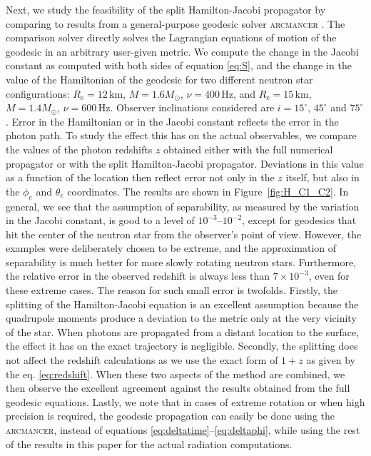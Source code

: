 \documentclass{aa}
\newcommand{\Msun}{\ensuremath{M_{\odot}}}
\begin{document}
Next, we study the feasibility of the split Hamilton-Jacobi propagator by comparing to results from a general-purpose geodesic solver \textsc{arcmancer} \citep{PRJ16}.
The comparison solver directly solves the Lagrangian equations of motion of the geodesic in an arbitrary user-given metric. 
We compute the change in the Jacobi constant as computed with both sides of equation \eqref{eq:S}, and the change in the value of the Hamiltonian of the geodesic for two different neutron star configurations:
$R_{\mathrm{e}}=12\,\mathrm{km}$, $M=1.6\Msun$, $\nu=400\,\mathrm{Hz}$, and $R_{\mathrm{e}}=15\,\mathrm{km}$, $M=1.4\Msun$, $\nu=600\,\mathrm{Hz}$.
Observer inclinations considered are $i=15^\circ$, $45^\circ$ and $75^\circ$.
Error in the Hamiltonian or in the Jacobi constant reflects the error in the photon path.
To study the effect this has on the actual observables, we compare the values of the photon redshifts $z$ obtained either with the full numerical propagator or with the split Hamilton-Jacobi propagator.
Deviations in this value as a function of the location then reflect error not only in the $z$ itself, but also in the $\phi_e$ and $\theta_e$ coordinates.
The results are shown in Figure~\ref{fig:H_C1_C2}. 
In general, we see that the assumption of separability, as measured by the variation in the Jacobi constant, is good to a level of $10^{-3}$--$10^{-2}$, except for geodesics that hit the center of the neutron star from the observer's point of view. 
However, the examples were deliberately chosen to be extreme, and the approximation of separability is much better for more slowly rotating neutron stars.
Furthermore, the relative error in the observed redshift is always less than $7 \times 10^{-3}$, even for these extreme cases.
The reason for such small error is twofolds.
Firstly, the splitting of the Hamilton-Jacobi equation is an excellent assumption because the quadrupole moments produce a deviation to the metric only at the very vicinity of the star.
When photons are propagated from a distant location to the surface, the effect it has on the exact trajectory is negligible.
Secondly, the splitting does not affect the redshift calculations as we use the exact form of $1+z$ as given by the eq. \eqref{eq:redshift}.
When these two aspects of the method are combined, we then observe the excellent agreement against the results obtained from the full geodesic equations.
Lastly, we note that in cases of extreme rotation or when high precision is required, the geodesic propagation can easily be done using the \textsc{arcmancer}, instead of equations \eqref{eq:deltatime}--\eqref{eq:deltaphi}, while using the rest of the results in this paper for the actual radiation computations.
\end{document}
